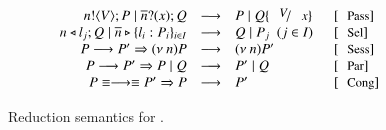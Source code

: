 \begin{figure}[t!]
\[
%
%
%
%
%
		\begin{array}{rcll}
			\bout{n}{V} P \Par \binp{\dual{n}}{x} Q & \red & P \Par Q \subst{V}{x} & \orule{Pass}
			\\
			\bsel{n}{l_j} Q \Par \bbra{\dual{n}}{l_i : P_i}_{i \in I} & \red & Q \Par P_j ~~(j \in I)~~  & \orule{Sel}
			\\
			P \red P' \Rightarrow \news{n} P & \red & \news{n} P'  & \orule{Sess}
			\\

			P \red P' \Rightarrow   P \Par Q & \red &  P' \Par Q  & \orule{Par}
			\\
			P \scong \red \scong P' \Rightarrow P & \red & P' & \orule{Cong}\\
		\end{array}
\]
	\caption{Reduction semantics for \HOp. \label{fig:reduction}}
\end{figure}
